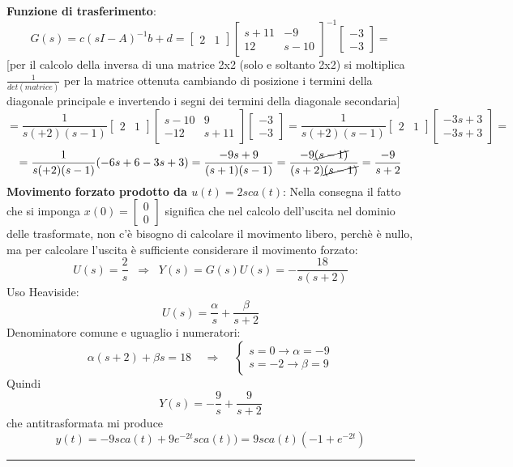 \textbf{Funzione di trasferimento}:
\[
    G(s) = c(sI-A)^{-1} b +d = \left[\begin{matrix}
        2 &1
    \end{matrix}\right] \left[\begin{matrix}
        s+11 & -9 \\ 12 & s-10
    \end{matrix}\right]^{-1} \left[\begin{matrix}
        -3\\-3
    \end{matrix}\right] =
\]
[per il calcolo della inversa di una matrice 2x2 (solo e soltanto 2x2) si moltiplica $\frac{1}{det(matrice)}$ per la matrice ottenuta cambiando di posizione i termini della diagonale principale e invertendo i segni dei termini della diagonale secondaria]
\[
    = \frac{1}{s(+2)(s-1)} \left[\begin{matrix}
        2 &1
    \end{matrix}\right] \left[\begin{matrix}
        s-10 & 9 \\ -12 & s+11
    \end{matrix}\right] \left[\begin{matrix}
        -3\\-3
    \end{matrix}\right] = \frac{1}{s(+2)(s-1)} \left[\begin{matrix}
        2 & 1
    \end{matrix}\right] \left[\begin{matrix}
        -3s+3\\-3s + 3
    \end{matrix}\right] =
\]
\[
    = \frac{1}{s(+2)(s-1)} (-6s + 6 -3s +3) = \frac{-9s +9}{(s+1)(s-1)} = \frac{-9 \cancel{(s-1)}}{(s+2)\cancel{(s-1)}} = \frac{-9}{s+2}
\]
\newline
\textbf{Movimento forzato prodotto da $u(t) = 2 sca(t)$}:\newline
Nella consegna il fatto che si imponga $x(0) = \left[\begin{matrix}
    0\\0
\end{matrix}\right]$ significa che nel calcolo dell'uscita nel dominio delle trasformate, non c'è bisogno di calcolare il movimento libero, perchè è nullo, ma per calcolare l'uscita è sufficiente considerare il movimento forzato:
\[
    U(s) = \frac{2}{s} \;\; \Rightarrow  \;\; Y(s) = G(s) U(s) = - \frac{18}{s(s+2)}
\]
Uso Heaviside:
\[
    U(s) = \frac{\alpha}{s} + \frac{\beta}{s+2}
\]
Denominatore comune e uguaglio i numeratori:
\[
    \alpha(s+2) + \beta s = 18 \;\;\;\; \Rightarrow \;\;\;\; \begin{cases}
        s= 0 \rightarrow \alpha = -9\\
        s = -2 \rightarrow  \beta = 9
    \end{cases}
\]
Quindi 
\[
    Y(s) = -\frac{9}{s} + \frac{9}{s+2}
\]
che antitrasformata mi produce
\[
    y(t) = - 9 sca(t) + 9 e^{-2t} sca(t)) = 9 sca(t) (-1 + e^{-2t})
\]
\rule{\textwidth}{0,4pt}
